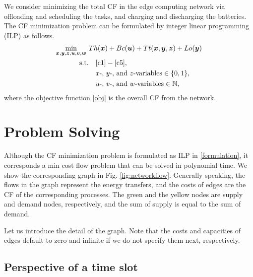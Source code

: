 \documentclass[conference, 10pt, ﬁnal, letterpaper, twocolumn]{IEEEtran}
\begin{document}
We consider minimizing the total CF in the edge computing network via offloading and scheduling the tasks, and charging and discharging the batteries. The CF minimization problem can be formulated by integer linear programming (ILP) as follows.
\begin{subequations}\label{formulation}
    \begin{align}
         \mathop{\min}_{\boldsymbol{x}, \boldsymbol{y}, \boldsymbol{z}, \boldsymbol{u}, \boldsymbol{v}, \boldsymbol{w}} \ &Th(\boldsymbol{x}) +  Bc(\boldsymbol{u}) + Tt(\boldsymbol{x}, \boldsymbol{y}, \boldsymbol{z}) + Lo(\boldsymbol{y}) \label{obj}\\
         \text{s.t.} & \quad \eqref{c1} - \eqref{c5},\notag\\
         & \quad x\text{-}\text{, } y\text{-}\text{, and } z\text{-variables} \in \{0,1\},\\
         & \quad u\text{-}\text{, } v\text{-}\text{, and } w\text{-variables} \in \mathbb{N},
    \end{align}
\end{subequations}
where the objective function \eqref{obj} is the overall CF from the network.

\section{Problem Solving} 



Although the CF minimization problem is formulated as ILP in \eqref{formulation}, it corresponds a min cost flow problem that can be solved in polynomial time. We show the corresponding graph in Fig. \ref{fig:networkflow}. Generally speaking, the flows in the graph represent the energy transfers, and the costs of edges are the CF of the corresponding processes. The green and the yellow nodes are supply and demand nodes, respectively, and the sum of supply is equal to the sum of demand.

Let us introduce the detail of the graph. Note that the costs and capacities of edges default to zero and infinite if we do not specify them next, respectively. 

\subsection{Perspective of a time slot}
\end{document}
